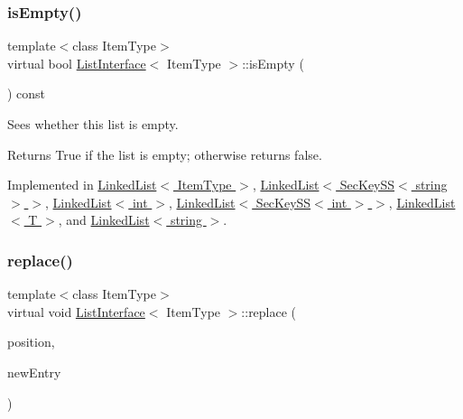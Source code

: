 \mbox{\label{classListInterface_a924f91e7f81d7dcd3fda79bbcc671394}} 
\subsubsection{\texorpdfstring{is\+Empty()}{isEmpty()}}
{\footnotesize\ttfamily template$<$class Item\+Type$>$ \\
virtual bool \hyperlink{classListInterface}{List\+Interface}$<$ Item\+Type $>$\+::is\+Empty (\begin{DoxyParamCaption}{ }\end{DoxyParamCaption}) const\hspace{0.3cm}{\ttfamily [pure virtual]}}

Sees whether this list is empty. \begin{DoxyReturn}{Returns}
True if the list is empty; otherwise returns false. 
\end{DoxyReturn}


Implemented in \hyperlink{classLinkedList_a008e916c3d51d28b4cc9c8cdf3e9d921}{Linked\+List$<$ Item\+Type $>$}, \hyperlink{classLinkedList_a008e916c3d51d28b4cc9c8cdf3e9d921}{Linked\+List$<$ Sec\+Key\+S\+S$<$ string $>$ $>$}, \hyperlink{classLinkedList_a008e916c3d51d28b4cc9c8cdf3e9d921}{Linked\+List$<$ int $>$}, \hyperlink{classLinkedList_a008e916c3d51d28b4cc9c8cdf3e9d921}{Linked\+List$<$ Sec\+Key\+S\+S$<$ int $>$ $>$}, \hyperlink{classLinkedList_a008e916c3d51d28b4cc9c8cdf3e9d921}{Linked\+List$<$ T $>$}, and \hyperlink{classLinkedList_a008e916c3d51d28b4cc9c8cdf3e9d921}{Linked\+List$<$ string $>$}.

\mbox{\label{classListInterface_aae877a56b7b9f5f526c37a00e234fad1}} 
\subsubsection{\texorpdfstring{replace()}{replace()}}
{\footnotesize\ttfamily template$<$class Item\+Type$>$ \\
virtual void \hyperlink{classListInterface}{List\+Interface}$<$ Item\+Type $>$\+::replace (\begin{DoxyParamCaption}\item[{int}]{position,  }\item[{const Item\+Type \&}]{new\+Entry }\end{DoxyParamCaption})\hspace{0.3cm}{\ttfamily [pure virtual]}}

